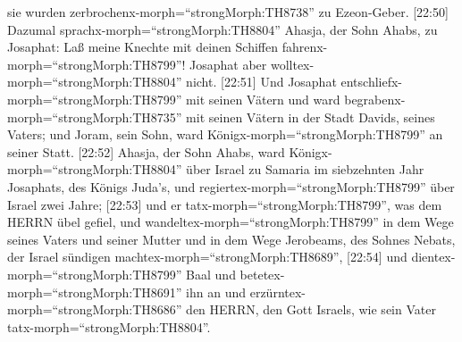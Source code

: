 sie wurden zerbrochenx-morph=``strongMorph:TH8738'' zu Ezeon-Geber.
 {[}22:50{]} Dazumal sprachx-morph=``strongMorph:TH8804''
Ahasja, der Sohn Ahabs, zu Josaphat: Laß meine Knechte mit deinen
Schiffen fahrenx-morph=``strongMorph:TH8799''! Josaphat aber
wolltex-morph=``strongMorph:TH8804'' nicht.  {[}22:51{]}
Und Josaphat entschliefx-morph=``strongMorph:TH8799'' mit seinen Vätern
und ward begrabenx-morph=``strongMorph:TH8735'' mit seinen Vätern in der
Stadt Davids, seines Vaters; und Joram, sein Sohn, ward
Königx-morph=``strongMorph:TH8799'' an seiner Statt. 
{[}22:52{]} Ahasja, der Sohn Ahabs, ward
Königx-morph=``strongMorph:TH8804'' über Israel zu Samaria im
siebzehnten Jahr Josaphats, des Königs Juda's, und
regiertex-morph=``strongMorph:TH8799'' über Israel zwei Jahre;
 {[}22:53{]} und er tatx-morph=``strongMorph:TH8799'', was
dem HERRN übel gefiel, und wandeltex-morph=``strongMorph:TH8799'' in dem
Wege seines Vaters und seiner Mutter und in dem Wege Jerobeams, des
Sohnes Nebats, der Israel sündigen machtex-morph=``strongMorph:TH8689'',
 {[}22:54{]} und dientex-morph=``strongMorph:TH8799'' Baal
und betetex-morph=``strongMorph:TH8691'' ihn an und
erzürntex-morph=``strongMorph:TH8686'' den HERRN, den Gott Israels, wie
sein Vater tatx-morph=``strongMorph:TH8804''.

